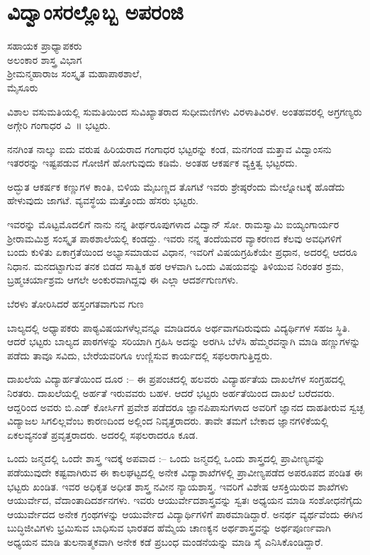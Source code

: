 {\fontsize{14}{16}\selectfont
\chapter{ವಿದ್ವಾಂಸರಲ್ಲೊಬ್ಬ ಅಪರಂಜಿ}

\begin{center}
\smallskip

ಸಹಾಯಕ ಪ್ರಾಧ್ಯಾಪಕರು\\
ಅಲಂಕಾರ ಶಾಸ್ತ್ರ ವಿಭಾಗ\\
ಶ್ರೀಮನ್ಮಹಾರಾಜ ಸಂಸ್ಕೃತ ಮಹಾಪಾಠಶಾಲೆ,\\ 
ಮೈಸೂರು
\addrule
\end{center}

ವಿಶಾಲ ವಸುಮತಿಯಲ್ಲಿ ಸುಮತಿಯಿಂದ ಸುವಿಖ್ಯಾತರಾದ ಸುಧೀಮಣಿಗಳು ವಿರಳಾತಿವಿರಳ.  ಅಂತಹವರಲ್ಲಿ ಅಗ್ರಗಣ್ಯರು ಅಗ್ಗೇರಿ ಗಂಗಾಧರ ವಿ~॥ ಭಟ್ಟರು.

ನನಗಿಂತ ನಾಲ್ಕು ಐದು ವರುಷ ಹಿರಿಯರಾದ ಗಂಗಾಧರ ಭಟ್ಟರನ್ನು ಕಂಡ, ಮನಗಂಡ ಮತ್ತಾವ ವಿದ್ವಾಂಸನು ಇತರರನ್ನು ಇಷ್ಟಪಡುವ ಗೋಜಿಗೆ ಹೋಗುವುದು ಕಡಿಮೆ.  ಅಂತಹ ಆಕರ್ಷಕ ವ್ಯಕ್ತಿತ್ವ ಭಟ್ಟರದು.

ಅದ್ಭುತ ಆಕರ್ಷಕ ಕಣ್ಣುಗಳ ಕಾಂತಿ, ಬಿಳಿಯ ಮೈಬಣ್ಣದ ತೊಗಟೆ ಇವರು ಶ್ರೇಷ್ಠರೆಂದು  ಮೇಲ್ನೋಟಕ್ಕೆ ಹೊಡೆದು ಹೇಳುವುದು ಜಾಗಟೆ. ವ್ಯವಸ್ಥೆಯ ಮತ್ತೊಂದು ಹೆಸರು ಭಟ್ಟರು.

ಇವರನ್ನು ಮೊಟ್ಟಮೊದಲಿಗೆ ನಾನು ನನ್ನ ತೀರ್ಥರೂಪುಗಳಾದ ವಿದ್ವಾನ್ ಸೋ. ರಾಮಸ್ವಾಮಿ ಐಯ್ಯಂಗಾರ್ಯರ ಶ್ರೀರಾಮಮಿಶ್ರ ಸಂಸ್ಕೃತ ಪಾಠಶಾಲೆಯಲ್ಲಿ ಕಂಡದ್ದು.  ಇವರು ನನ್ನ ತಂದೆಯವರ ವ್ಯಾಕರಣದ ಕೆಲವು ಅವಧಿಗಳಿಗೆ ಬಂದು ಕುಳಿತು ಏಕಾಗ್ರತೆಯಿಂದ ಅಭ್ಯಾಸಮಾಡುವ ವಿಧಾನ, ಇವರಿಗೆ ವಿಷಯಗ್ರಹಿಕೆಯೇ ಪ್ರಧಾನ, ಅದರಲ್ಲಿ ಆದರೂ ನಿಧಾನ. ಮನದಟ್ಟಾಗುವ ತನಕ ಬಿಡದ ಸಾತ್ವಿಕ ಹಠ ಆಳವಾಗಿ ಒಂದು ವಿಷಯವನ್ನು ತಿಳಿಯುವ ನಿರಂತರ ಶ್ರಮ, ಬ್ರಹ್ಮಚರ್ಯಾಶ್ರಮ ಆಗಲೇ ಅಂಕುರವಾಗಿದ್ದವು ಈ ಎಲ್ಲಾ ಆದರ್ಶಗುಣಗಳು.

ಬೆರಳು ತೋರಿಸಿದರೆ ಹಸ್ತಂಗತವಾಗುವ ಗುಣ

ಬಾಲ್ಯದಲ್ಲಿ ಅಧ್ಯಾಪಕರು ಪಾಠ್ಯವಿಷಯಗಳೆಲ್ಲವನ್ನೂ ಮಾಡಿದರೂ ಅರ್ಥವಾಗದಿರುವುದು ವಿದ್ಯರ್ಥಿಗಳ ಸಹಜ ಸ್ಥಿತಿ.  ಆದರೆ ಭಟ್ಟರು ಬಾಲ್ಯದ ಪಾಠಗಳನ್ನು ಸರಿಯಾಗಿ ಗ್ರಹಿಸಿ ಅದನ್ನು ಅರಗಿಸಿ ಬೆಳೆಸಿ ಹೆಮ್ಮರವನ್ನಾಗಿ ಮಾಡಿ ಹಣ್ಣುಗಳನ್ನು ಪಡೆದು ತಾವೂ ಸವಿದು, ಬೇರೆಯವರಿಗೂ ಉಣ್ಣಿಸುವ ಕಾರ್ಯದಲ್ಲಿ ಸಫಲರಾಗುತ್ತಿದ್ದರು.

ದಾಖಲೆಯ ವಿದ್ಯಾರ್ಹತೆಯಿಂದ ದೂರ :– ಈ ಪ್ರಪಂಚದಲ್ಲಿ ಹಲವರು ವಿದ್ಯಾರ್ಹತೆಯ ದಾಖಲೆಗಳ ಸಂಗ್ರಹದಲ್ಲಿ ನಿರತರು.  ದಾಖಲೆಯಲ್ಲಿ ಅರ್ಹತೆ ಇರುವವರು ಬಹಳ.  ಆದರೆ ಭಟ್ಟರು ಅರ್ಹತೆಯಿಂದ ದಾಖಲೆ ಬರೆದವರು.  ಆದ್ದರಿಂದ ಅವರು ಬಿ.ಎಡ್ ಕೋರ್ಸಿಗೆ ಪ್ರವೇಶ ಪಡೆದರೂ ಜ್ಞಾನಪಿಪಾಸುಗಳಾದ ಅವರಿಗೆ ಜ್ಞಾನದ ದಾಹತೀರುವ ಸ್ವಚ್ಛ ವಿದ್ಯಾಜಲ ಸಿಗಲಿಲ್ಲವೆಂಬ ಕಾರಣದಿಂದ ಅಲ್ಲಿಂದ ನಿವೃತ್ತರಾದರು.  ತಾವೇ ತಮಗೆ ಬೇಕಾದ ಜ್ಞಾನಗಳಿಕೆಯಲ್ಲಿ ಏಕಲವ್ಯನಂತೆ ಪ್ರವೃತ್ತರಾದರು.  ಅದರಲ್ಲಿ ಸಫಲರಾದರೂ ಕೂಡ.

ಒಂದು ಜನ್ಮದಲ್ಲಿ ಒಂದೇ ಶಾಸ್ತ್ರ ಇದಕ್ಕೆ ಅಪವಾದ :– ಒಂದು ಜನ್ಮದಲ್ಲಿ ಒಂದು ಶಾಸ್ತ್ರದಲ್ಲಿ ಪ್ರಾವೀಣ್ಯವನ್ನು ಪಡೆಯುವುದೇ ಕಷ್ಟವಾಗಿರುವ ಈ ಕಾಲಘಟ್ಟದಲ್ಲಿ ಅನೇಕ ವಿದ್ಯಾಶಾಖೆಗಳಲ್ಲಿ ಪ್ರಾವೀಣ್ಯಪಡೆದ ಅಪರೂಪದ ಪಂಡಿತ ಈ ಭಟ್ಟರು ಖಂಡಿತ.  ಇವರ ಅಧಿಕೃತ ಅಧೀತ ಶಾಸ್ತ್ರ ನವೀನ ನ್ಯಾಯಶಾಸ್ತ್ರ.  ಇವರಿಗೆ ವಿಶೇಷ ಆಸಕ್ತಿಯಿರುವ ಶಾಖೆಗಳು ಆಯುರ್ವೇದ, ವೆದಾಂತಾದಿದರ್ಶನಗಳು.  ಇವರು ಆಯುರ್ವೇದಶಾಸ್ತ್ರವನ್ನು ಸ್ವತಃ ಅಧ್ಯಯನ ಮಾಡಿ ಸಂಶೋಧನೆಗೈದು ಆಯುರ್ವೇದದ ಅನೇಕ ಗ್ರಂಥಗಳನ್ನು ಆಯುರ್ವೇದ ವಿದ್ಯಾರ್ಥಿಗಳಿಗೆ ಪಾಠಮಾಡಿದ್ದಾರೆ.  ಅನರ್ಥ ವ್ಯರ್ಥವೆಂದು ಈಗಿನ ಬುದ್ಧಿಜೀವಿಗಳು ಭ್ರಮಿಸುವ ಬಾಧಿಸುವ ಭಾರತದ ಹೆಮ್ಮೆಯ ಚಾಣಕ್ಯನ ಅರ್ಥಶಾಸ್ತ್ರವನ್ನು ಅರ್ಥಪೂರ್ಣವಾಗಿ ಅಧ್ಯಯನ ಮಾಡಿ ತುಲನಾತ್ಮಕವಾಗಿ ಅನೇಕ ಕಡೆ ಪ್ರಬಂಧ ಮಂಡನೆಯನ್ನು ಮಾಡಿ ಸೈ ಎನಿಸಿಕೊಂಡಿದ್ದಾರೆ.

}
